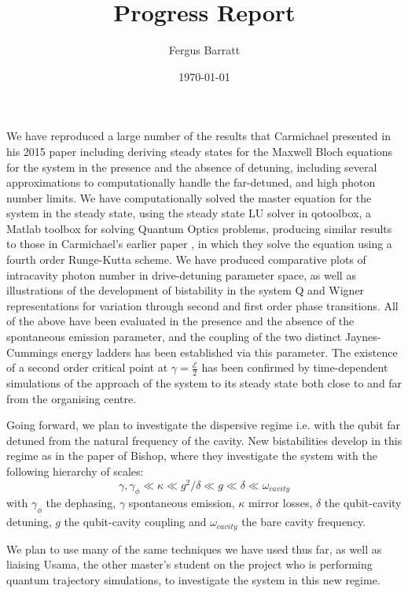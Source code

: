 \documentclass[reqno]{amsart}
\title{Progress Report}
\author{Fergus Barratt}
\date{\today}
\newcommand{\Epsilon}{\mathcal{E}}
\begin{document}
  \maketitle
  We have reproduced a large number of the results that Carmichael presented in his 2015 paper \autocite{Carmichael2015} including deriving steady states for the Maxwell Bloch equations for the system in the presence and the absence of detuning, including several approximations to computationally handle the far-detuned, and high photon number limits. We have computationally solved the master equation for the system in the steady state, using the steady state LU solver in qotoolbox, a Matlab toolbox for solving Quantum Optics problems, producing similar results to those in Carmichael's earlier paper \autocite{Alsing1999}, in which they solve the equation using a fourth order Runge-Kutta scheme. We have produced comparative plots of intracavity photon number in drive-detuning parameter space, as well as illustrations of the development of bistability in the system Q and Wigner representations for variation through second and first order phase transitions. All of the above have been evaluated in the presence and the absence of the spontaneous emission parameter, and the coupling of the two distinct Jaynes-Cummings energy ladders has been established via this parameter. The existence of a second order critical point at $\gamma = \frac{\Epsilon}{2}$ has been confirmed by time-dependent simulations of the approach of the system to its steady state both close to and far from the organising centre.

  Going forward, we plan to investigate the dispersive regime i.e. with the qubit far detuned from the natural frequency of the cavity. New bistabilities develop in this regime as in the paper of Bishop\autocite{Bishop2010}, where they investigate the system with the following hierarchy of scales:
  \begin{equation}
    \gamma, \gamma_\phi \ll \kappa \ll g^2/ \delta \ll g \ll \delta \ll \omega_{cavity}
  \end{equation}
  with $\gamma_\phi$ the dephasing, $\gamma$ spontaneous emission, $\kappa$ mirror losses, $\delta$ the qubit-cavity detuning, $g$ the qubit-cavity coupling and $\omega_{cavity}$ the bare cavity frequency.

  We plan to use many of the same techniques we have used thus far, as well as liaising Usama, the other master's student on the project who is performing quantum trajectory simulations, to investigate the system in this new regime.

  \printbibliography\
\end{document}
